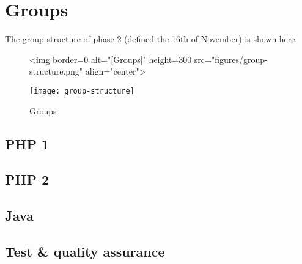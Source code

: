 \section*{Groups}
\label{sec:groups}


The group structure of phase 2 (defined the 16th of November) is shown
here.





{

\begin{figure}[htbp]
  \ifweb
  \centering
  \begin{rawhtml}
    <img border=0 alt="[Groups]" height=300  src="figures/group-structure.png" align="center">
  \end{rawhtml}
  \else
  \centering
  \texttt{[image: group-structure]}  
  \fi
  \caption{Groups}
  \label{fig:groups}
\end{figure}
}









\subsection*{PHP 1}
\label{sec:group.php1}



\subsection*{PHP 2}
\label{sec:group.php2}


\subsection*{Java}
\label{sec:group.java}


\subsection*{Test \& quality assurance}
\label{sec:group.test}



